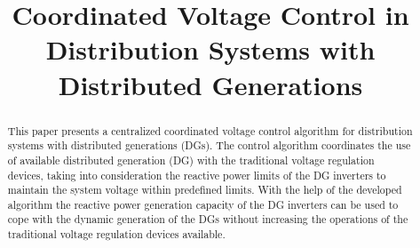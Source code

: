 \documentclass[conference]{IEEEtran}
\begin{document}
\title{Coordinated Voltage Control in Distribution
Systems with Distributed Generations}

\author{
}






\maketitle

\graphicspath{{figs/}}
\begin{abstract}
This paper presents a centralized coordinated voltage control algorithm for distribution systems with distributed generations (DGs).  The control algorithm coordinates the use of available distributed generation (DG) with the traditional voltage regulation devices, taking into consideration the reactive power limits of the DG inverters to maintain the system voltage within predefined limits. With the help of the developed algorithm the reactive power generation capacity of the DG inverters can be used to cope with the dynamic generation of the DGs without increasing the operations of the traditional voltage regulation devices available.
\end{abstract}
\end{document}
